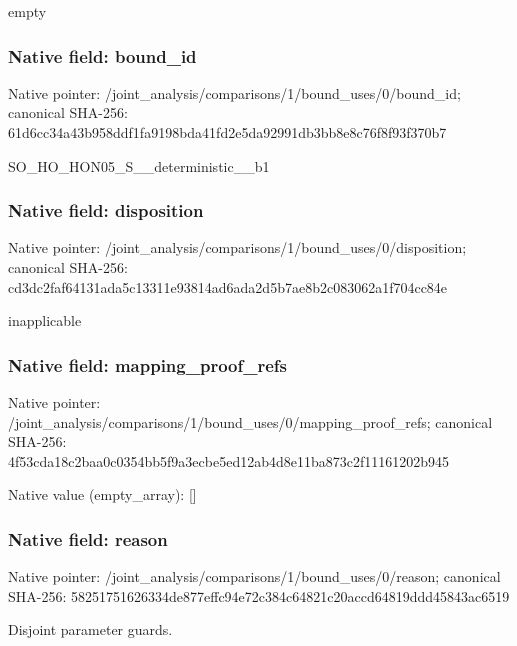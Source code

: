 \documentclass[10pt,a4paper]{article}
\begin{document}
\begingroup\raggedright\sloppy empty\par\endgroup

\subsubsection{Native field: bound\_\allowbreak{}id}
Native pointer: /joint\_\allowbreak{}analysis/comparisons/1/bound\_\allowbreak{}uses/0/bound\_\allowbreak{}id; canonical SHA-256: 61d6cc34a43b958ddf1fa9198bda41fd2e5da92991db3bb8e8c76f8f93f370b7

\begingroup\raggedright\sloppy SO\_\allowbreak{}HO\_\allowbreak{}HON05\_\allowbreak{}S\_\allowbreak{}\_\allowbreak{}deterministic\_\allowbreak{}\_\allowbreak{}b1\par\endgroup

\subsubsection{Native field: disposition}
Native pointer: /joint\_\allowbreak{}analysis/comparisons/1/bound\_\allowbreak{}uses/0/disposition; canonical SHA-256: cd3dc2faf64131ada5c13311e93814ad6ada2d5b7ae8b2c083062a1f704cc84e

\begingroup\raggedright\sloppy inapplicable\par\endgroup

\subsubsection{Native field: mapping\_\allowbreak{}proof\_\allowbreak{}refs}
Native pointer: /joint\_\allowbreak{}analysis/comparisons/1/bound\_\allowbreak{}uses/0/mapping\_\allowbreak{}proof\_\allowbreak{}refs; canonical SHA-256: 4f53cda18c2baa0c0354bb5f9a3ecbe5ed12ab4d8e11ba873c2f11161202b945

Native value (empty\_\allowbreak{}array): []

\subsubsection{Native field: reason}
Native pointer: /joint\_\allowbreak{}analysis/comparisons/1/bound\_\allowbreak{}uses/0/reason; canonical SHA-256: 58251751626334de877effc94e72c384c64821c20accd64819ddd45843ac6519

\begingroup\raggedright\sloppy Disjoint parameter guards.\par\endgroup
\end{document}
